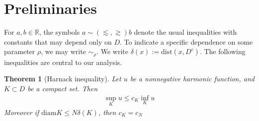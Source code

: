 \documentclass[a4paper,12pt]{article}
\newtheorem{theorem}{Theorem}[section]
\theoremstyle{definition}
\theoremstyle{definition}
\begin{document}
	\section{Preliminaries}\label{sec:prel}
	For $a,b\in\mathbb{R}$, the symbols $a\sim(\lesssim,\gtrsim) b$ denote the usual inequalities with constants that may depend only on $D$. To indicate a specific dependence on some parameter $\rho$, we may write $\sim_\rho$.  We write $\delta(x):=\text{dist}(x,D^c)$. The following inequalities are central to our analysis.
	
	\begin{theorem} [Harnack inequality]
		\label{thm:Harnack_ineq}
		Let $u$ be a nonnegative harmonic function, and $K\subset D$ be a compact set. Then
		\begin{align*}
			\sup_Ku\leq c_K \inf_K u
		\end{align*}
	Moreover if $\mathrm{diam}K\leq N \delta(K)$, then $c_K=c_N$
	\end{theorem} 
	
\end{document}
